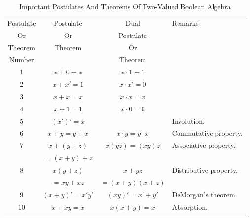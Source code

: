 \begin{table}
\caption{Important Postulates And Theorems Of Two-Valued Boolean Algebra}
\label{tbl:cbal0:ssam0:spos0:01}
\begin{center}
\begin{tabular}{|c||c|c||l|}
\hline
\small{Postulate} &  \small{Postulate}   & \small{Dual}        & \small{Remarks}   \\
\small{Or}        &  \small{Or}          & \small{Postulate}   &                   \\
\small{Theorem}   &  \small{Theorem}     & \small{Or}          &                   \\
\small{Number}    &                      & \small{Theorem}     &                   \\
\hline
      1           &  $x + 0 = x$         & $x \cdot 1 = 1$     &                   \\
\hline
      2           &  $x + x' = 1$        & $x \cdot x' = 0$    &                   \\
\hline
      3           &  $x + x = x$         & $x \cdot x = x$     &                   \\
\hline
      4           &  $x + 1 = 1$         & $x \cdot 0 = 0$     &                   \\
\hline
      5           &  $(x')' = x$         &                     & \small{Involution.} \\
\hline
      6           &  $x + y = y + x$     & $x \cdot y = y \cdot x $ & \small{Commutative property.} \\
\hline
      7           &  $x + (y + z)$       & $x(yz) = (xy)z$  & \small{Associative property.} \\
                  &  $= (x + y) + z$     &                     &                            \\
\hline
      8           &  $x (y + z)$         & $x + yz$          & \small{Distributive property.} \\
                  &  $= xy + xz$                    & $= (x+y)(x+z)$      &                                \\
\hline
      9           &  $(x+y)' = x'y'$      & $(xy)' = x' + y'$  & \small{DeMorgan's theorem.} \\
\hline
     10           &  $x + xy = x$         & $x(x+y) = x$       & \small{Absorption.} \\
\hline
\end{tabular}
\end{center}
\end{table}

